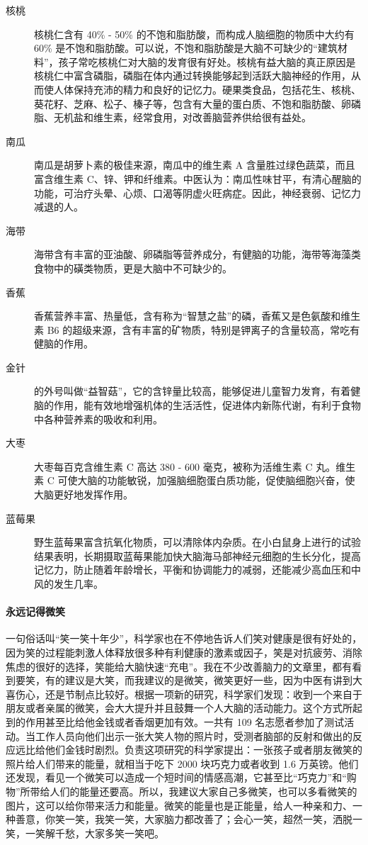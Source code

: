 \begin{description}
    \item[核桃] 核桃仁含有 40\% - 50\% 的不饱和脂肪酸，而构成人脑细胞的物质中大约有 60\% 是不饱和脂肪酸。可以说，不饱和脂肪酸是大脑不可缺少的“建筑材料”，孩子常吃核桃仁对大脑的发育很有好处。核桃有益大脑的真正原因是核桃仁中富含磷脂，磷脂在体内通过转换能够起到活跃大脑神经的作用，从而使人体保持充沛的精力和良好的记忆力。硬果类食品，包括花生、核桃、葵花籽、芝麻、松子、榛子等，包含有大量的蛋白质、不饱和脂肪酸、卵磷脂、无机盐和维生素，经常食用，对改善脑营养供给很有益处。
    \item[南瓜] 南瓜是胡萝卜素的极佳来源，南瓜中的维生素 A 含量胜过绿色蔬菜，而且富含维生素 C、锌、钾和纤维素。中医认为：南瓜性味甘平，有清心醒脑的功能，可治疗头晕、心烦、口渴等阴虚火旺病症。因此，神经衰弱、记忆力减退的人。
    \item[海带] 海带含有丰富的亚油酸、卵磷脂等营养成分，有健脑的功能，海带等海藻类食物中的磺类物质，更是大脑中不可缺少的。
    \item[香蕉] 香蕉营养丰富、热量低，含有称为“智慧之盐”的磷，香蕉又是色氨酸和维生素 B6 的超级来源，含有丰富的矿物质，特别是钾离子的含量较高，常吃有健脑的作用。
    \item[金针] 的外号叫做“益智菇”，它的含锌量比较高，能够促进儿童智力发育，有着健脑的作用，能有效地增强机体的生活活性，促进体内新陈代谢，有利于食物中各种营养素的吸收和利用。
    \item[大枣] 大枣每百克含维生素 C 高达 380 - 600 毫克，被称为活维生素 C 丸。维生素 C 可使大脑的功能敏锐，加强脑细胞蛋白质功能，促使脑细胞兴奋，使大脑更好地发挥作用。
    \item[蓝莓果] 野生蓝莓果富含抗氧化物质，可以清除体内杂质。在小白鼠身上进行的试验结果表明，长期摄取蓝莓果能加快大脑海马部神经元细胞的生长分化，提高记忆力，防止随着年龄增长，平衡和协调能力的减弱，还能减少高血压和中风的发生几率。
\end{description}

\paragraph{永远记得微笑} 一句俗话叫“笑一笑十年少”，科学家也在不停地告诉人们笑对健康是很有好处的，因为笑的过程能刺激人体释放很多种有利健康的激素或因子，笑是对抗疲劳、消除焦虑的很好的选择，笑能给大脑快速“充电”。我在不少改善脑力的文章里，都有看到要笑，有的建议是大笑，而我建议的是微笑，微笑更好一些，因为中医有讲到大喜伤心，还是节制点比较好。根据一项新的研究，科学家们发现：收到一个来自于朋友或者亲属的微笑，会大大提升并且鼓舞一个人大脑的活动能力。这个方式所起到的作用甚至比给他金钱或者香烟更加有效。一共有 109 名志愿者参加了测试活动。当工作人员向他们出示一张大笑人物的照片时，受测者脑部的反射和做出的反应远比给他们金钱时剧烈。负责这项研究的科学家提出：一张孩子或者朋友微笑的照片给人们带来的能量，就相当于吃下 2000 块巧克力或者收到 1.6 万英镑。他们还发现，看见一个微笑可以造成一个短时间的情感高潮，它甚至比“巧克力”和“购物”所带给人们的能量还要高。所以，我建议大家自己多微笑，也可以多看微笑的图片，这可以给你带来活力和能量。微笑的能量也是正能量，给人一种亲和力、一种善意，你笑一笑，我笑一笑，大家脑力都改善了；会心一笑，超然一笑，洒脱一笑，一笑解千愁，大家多笑一笑吧。

